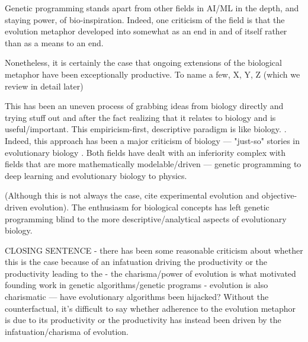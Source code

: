Genetic programming stands apart from other fields in AI/ML in the depth, and staying power, of bio-inspiration.
Indeed, one criticism of the field is that the evolution metaphor developed into somewhat as an end in and of itself rather than as a means to an end.

Nonetheless, it is certainly the case that ongoing extensions of the biological metaphor have been exceptionally productive.
To name a few, X, Y, Z (which we review in detail later)

This has been an uneven process of grabbing ideas from biology directly and trying stuff out and after the fact realizing that it relates to biology and is useful/important.
This empiricism-first, descriptive paradigm is like biology. \citep{welch2017wrong}.
Indeed, this approach has been a major criticism of biology --- "just-so" stories in evolutionary biology \citep{smith2016explanations}.
Both fields have dealt with an inferiority complex with fields that are more mathematically modelable/driven --- genetic programming to deep learning and evolutionary biology to physics.

(Although this is not always the case, cite experimental evolution and objective-driven evolution).
The enthusiasm for biological concepts has left genetic programming blind to the more descriptive/analytical aspects of evolutionary biology.

CLOSING SENTENCE
- there has been some reasonable criticism about whether this is the case because of an infatuation driving the productivity or the productivity leading to the
- the charisma/power of evolution is what motivated founding work in genetic algorithms/genetic programs
- evolution is also charismatic --- have evolutionary algorithms been hijacked?
Without the counterfactual, it's difficult to say whether adherence to the evolution metaphor is due to its productivity or the productivity has instead been driven by the infatuation/charisma of evolution.

